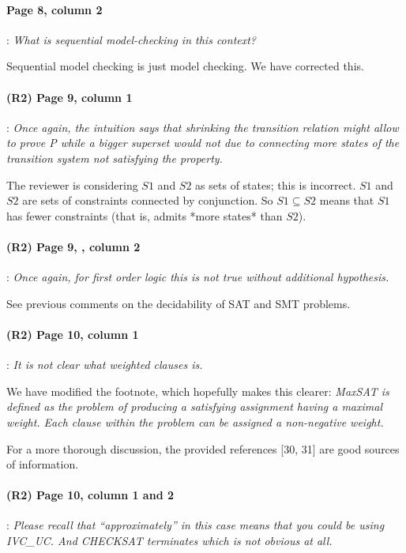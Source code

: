 \documentclass{article}
\begin{document}
\paragraph{Page 8, column 2}: \textit{What is sequential model-checking in this context?} 
\vspace{0.05in}


\noindent Sequential model checking is just model checking. We have corrected this.


\paragraph{(R2) Page 9, column 1}: \textit{Once again, the intuition says that shrinking the transition relation might allow to prove P while a bigger superset would not due to connecting more states of the transition system not satisfying the property.}
\vspace{0.05in}

\noindent The reviewer is considering $S1$ and $S2$ as sets of states; this is incorrect.  $S1$ and $S2$ are sets of constraints connected by conjunction.  So $S1 \subseteq S2$ means that $S1$ has fewer constraints (that is, admits *more states* than $S2$).

\paragraph{(R2) Page 9, , column 2}: \textit{Once again, for first order logic this is not true without additional hypothesis.}
\vspace{0.05in}

\noindent See previous comments on the decidability of SAT and SMT problems.

\paragraph{(R2) Page 10, column 1}: \textit{It is not clear what weighted clauses is.}
\vspace{0.05in}

\noindent We have modified the footnote, which hopefully makes this clearer: 
\textit{MaxSAT is defined as the problem of producing a satisfying assignment having a maximal {\em weight}.  Each clause within the problem can be assigned a non-negative weight.}  

For a more thorough discussion, the provided references [30, 31] are good sources of information.


\paragraph{(R2) Page 10, column 1 and 2}: \textit{Please recall that “approximately” in this case means that you could be using IVC\_UC.  And CHECKSAT terminates which is not obvious at all.}
\vspace{0.05in}
\end{document}
